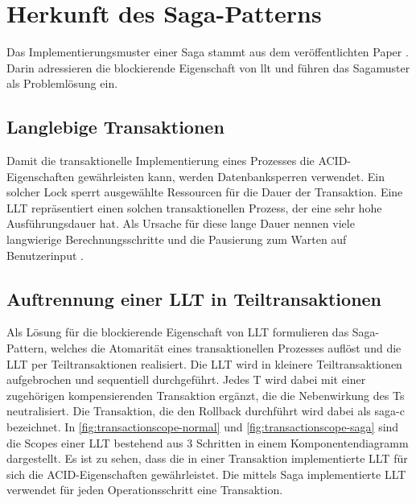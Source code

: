 \section{Herkunft des Saga-Patterns}\label{sec:section-garcia-paper}

Das Implementierungsmuster einer Saga stammt aus dem \citeyear{GarciaMolina.1987} veröffentlichten Paper . Darin adressieren \citeauthor{GarciaMolina.1987} die blockierende Eigenschaft von \acrfull{llt} und führen das Sagamuster als Problemlösung ein. 

\subsection{Langlebige Transaktionen}
Damit die transaktionelle Implementierung eines Prozesses die ACID-Eigenschaften gewährleisten kann, werden Datenbanksperren verwendet. Ein solcher Lock sperrt ausgewählte Ressourcen für die Dauer der Transaktion. Eine LLT repräsentiert einen solchen transaktionellen Prozess, der eine sehr hohe Ausführungsdauer hat. Als Ursache für diese lange Dauer nennen \citeauthor{GarciaMolina.1987} viele langwierige Berechnungsschritte und die Pausierung zum Warten auf Benutzerinput \cite{GarciaMolina.1987}. 

\subsection{Auftrennung einer LLT in Teiltransaktionen}
Als Lösung für die blockierende Eigenschaft von LLT formulieren \citeauthor{GarciaMolina.1987} das Saga-Pattern, welches die Atomarität eines transaktionellen Prozesses auflöst und die LLT per Teiltransaktionen realisiert. Die LLT wird in kleinere Teiltransaktionen aufgebrochen und sequentiell durchgeführt. Jedes T wird dabei mit einer zugehörigen kompensierenden Transaktion ergänzt, die die Nebenwirkung des Ts neutralisiert. Die Transaktion, die den Rollback durchführt wird dabei als \acrfull{saga-c} bezeichnet. In \cref{fig:transactionscope-normal} und \cref{fig:transactionscope-saga} sind die Scopes einer LLT bestehend aus 3 Schritten in einem Komponentendiagramm dargestellt. Es ist zu sehen, dass die in einer Transaktion implementierte LLT für sich die ACID-Eigenschaften gewährleistet. Die mittels Saga implementierte LLT verwendet für jeden Operationsschritt eine Transaktion.

